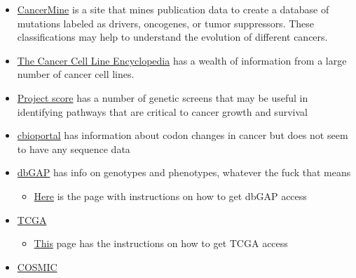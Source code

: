 \documentclass[]{book}
\providecommand{\tightlist}{%
  \setlength{\itemsep}{0pt}\setlength{\parskip}{0pt}}
\begin{document}
\begin{itemize}
\tightlist
\item
  \href{http://bionlp.bcgsc.ca/cancermine/}{CancerMine} is a site that mines publication data to create a database of mutations labeled as drivers, oncogenes, or tumor suppressors. These classifications may help to understand the evolution of different cancers.
\item
  \href{https://www.nature.com/articles/s41586-019-1186-3?WT.ec_id=NATURE-201905\&sap-outbound-id=720FBE4668F2FE14A299D42CB43EF50D90063A16\&mkt-key=005056A5C6311ED999AC3A52796F7641}{The Cancer Cell Line Encyclopedia} has a wealth of information from a large number of cancer cell lines.
\item
  \href{https://score.depmap.sanger.ac.uk/}{Project score} has a number of genetic screens that may be useful in identifying pathways that are critical to cancer growth and survival
\item
  \href{http://www.cbioportal.org/}{cbioportal} has information about codon changes in cancer but does not seem to have any sequence data
\item
  \href{https://dbgap.ncbi.nlm.nih.gov/aa/wga.cgi?page=login}{dbGAP} has info on genotypes and phenotypes, whatever the fuck that means

  \begin{itemize}
  \tightlist
  \item
    \href{https://dbgap.ncbi.nlm.nih.gov/aa/wga.cgi?page=login}{Here} is the page with instructions on how to get dbGAP access
  \end{itemize}
\item
  \href{https://www.cancer.gov/about-nci/organization/ccg/research/structural-genomics/tcga}{TCGA}

  \begin{itemize}
  \tightlist
  \item
    \href{https://gdc.cancer.gov/access-data/obtaining-access-controlled-data}{This} page has the instructions on how to get TCGA access
  \end{itemize}
\item
  \href{https://cancer.sanger.ac.uk/cosmic}{COSMIC}


\end{itemize}
\end{document}
